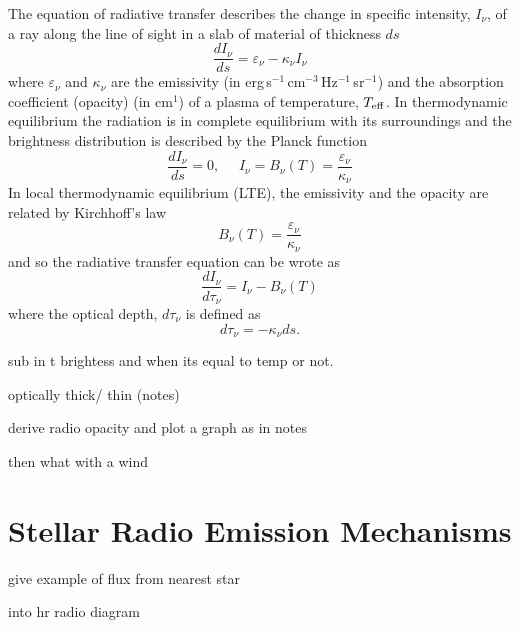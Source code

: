 The equation of radiative transfer describes the change in specific intensity, $I_{\nu}$, of a ray along the line of sight in a slab of material of thickness $ds$
\begin{equation}
\frac{dI_{\nu}}{ds}=\varepsilon _{\nu} - \kappa _{\nu}I_{\nu}
\end{equation}
where $\varepsilon _{\nu}$ and $\kappa _{\nu}$ are the emissivity (in erg\,s$^{-1}$\,cm$^{-3}$\,Hz$^{-1}$\,sr$^{-1}$) and the absorption coefficient (opacity) (in cm$^{1}$) of a plasma of temperature, $T_{\rm{eff}}$. In thermodynamic equilibrium the radiation is in complete equilibrium with its surroundings and the brightness distribution is described by the Planck function
\begin{equation}
\dfrac{dI_{\nu}}{ds}=0, \ \ \ \ \ \ I_{\nu}= B_{\nu}(T)=\frac{\varepsilon _{\nu}}{\kappa _{\nu}}
\end{equation}
In local thermodynamic equilibrium (LTE), the emissivity and the opacity are related by Kirchhoff's law
\begin{equation}
B_{\nu}(T)=\frac{\varepsilon _{\nu}}{\kappa _{\nu}}
\end{equation}
and so the radiative transfer equation can be wrote as
\begin{equation}
\dfrac{dI_{\nu}}{d\tau _{\nu}}=I_{\nu}-B_{\nu}(T)
\end{equation}
where the optical depth, $d\tau _{\nu}$ is defined as
\begin{equation}
d\tau _{\nu}=-\kappa _{\nu}ds.
\end{equation}

sub in t brightess and when its equal to temp or not.

optically thick/ thin (notes)

derive radio opacity and plot a graph as in notes

then what with a wind

\section{Stellar Radio Emission Mechanisms}\label{sec:3.1}
give example of flux from nearest star 
 
into hr radio diagram


